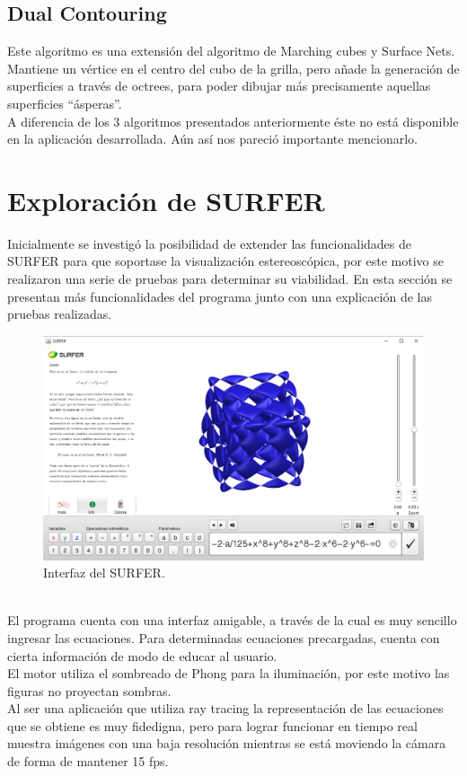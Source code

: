 \documentclass[12pt]{article}
\begin{document}
\subsection{Dual Contouring}
Este algoritmo es una extensión del algoritmo de Marching cubes y Surface Nets. Mantiene un vértice en el centro del cubo de la grilla, pero añade la generación de superficies a través de octrees, para poder dibujar más precisamente aquellas superficies “ásperas”. \\A diferencia de los 3 algoritmos presentados anteriormente éste no está disponible en la aplicación desarrollada. Aún así nos pareció importante mencionarlo\cite{dualcontour}.
\clearpage
\section{Exploración de SURFER}
Inicialmente se investigó la posibilidad de extender las funcionalidades de SURFER para que soportase la visualización estereoscópica, por este motivo se realizaron una serie de pruebas para determinar su viabilidad. En esta sección se presentan más funcionalidades del programa junto con una explicación de las pruebas realizadas.
\begin{figure}[h]
\includegraphics[width=\textwidth]{surfer_interfaz.png}
\caption{Interfaz del SURFER.}
\end{figure}
\\El programa cuenta con una interfaz amigable, a través de la cual es muy sencillo ingresar las ecuaciones. Para determinadas ecuaciones precargadas, cuenta con cierta información de modo de educar al usuario.
\\El motor utiliza el sombreado de Phong\cite{Phong} para la iluminación, por este motivo las figuras no proyectan sombras.
\\Al ser una aplicación que utiliza ray tracing la representación de las ecuaciones que se obtiene es muy fidedigna, pero para lograr funcionar en tiempo real muestra imágenes con una baja resolución mientras se está moviendo la cámara de forma de mantener 15 fps.
\end{document}
